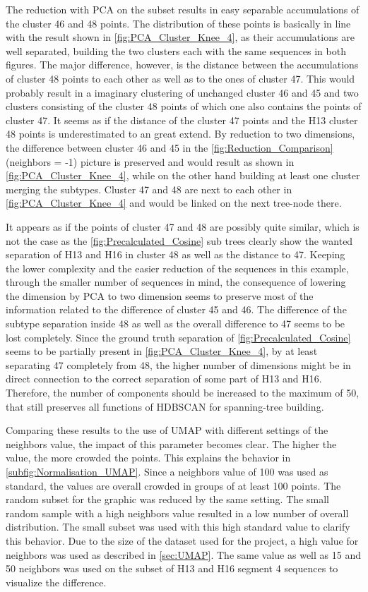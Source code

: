 The reduction with \gls{PCA} on the subset results in easy separable accumulations of the cluster 46 and 48 points. The distribution of these points is basically in line with the result shown in \autoref{fig:PCA_Cluster_Knee_4}, as their accumulations are well separated, building the two clusters each with the same sequences in both figures. The major difference, however, is the distance between the accumulations of cluster 48 points to each other as well as to the ones of cluster 47. This would probably result in a imaginary clustering of unchanged cluster 46 and 45 and two clusters consisting of the cluster 48 points of which one also contains the points of cluster 47. It seems as if the distance of the cluster 47 points and the H13 cluster 48 points is underestimated to an great extend. By reduction to two dimensions, the difference between cluster 46 and 45 in the \autoref{fig:Reduction_Comparison} (neighbors = -1) picture is preserved and would result as shown in \autoref{fig:PCA_Cluster_Knee_4}, while on the other hand building at least one cluster merging the subtypes. Cluster 47 and 48 are next to each other in \autoref{fig:PCA_Cluster_Knee_4} and would be linked on the next tree-node there.

It appears as if the points of cluster 47 and 48 are possibly quite similar, which is not the case as the \autoref{fig:Precalculated_Cosine} sub trees clearly show the wanted separation of H13 and H16 in cluster 48 as well as the distance to 47. Keeping the lower complexity and the easier reduction of the sequences in this example, through the smaller number of sequences in mind, the consequence of lowering the dimension by \gls{PCA} to two dimension seems to preserve most of the information related to the difference of cluster 45 and 46. The difference of the subtype separation inside 48 as well as the overall difference to 47 seems to be lost completely. Since the ground truth separation of \autoref{fig:Precalculated_Cosine} seems to be partially present in \autoref{fig:PCA_Cluster_Knee_4}, by at least separating 47 completely from 48, the higher number of dimensions might be in direct connection to the correct separation of some part of H13 and H16. Therefore, the number of components should be increased to the maximum of 50, that still preserves all functions of \gls{HDBSCAN} for spanning-tree building. 

Comparing these results to the use of \gls{UMAP} with different settings of the neighbors value, the impact of this parameter becomes clear. The higher the value, the more crowded the points. This explains the behavior in \autoref{subfig:Normalisation_UMAP}. Since a neighbors value of 100 was used as standard, the values are overall crowded in groups of at least 100 points. The random subset for the graphic was reduced by the same setting. The small random sample with a high neighbors value resulted in a low number of overall distribution. The small subset was used with this high standard value to clarify this behavior. Due to the size of the dataset used for the project, a high value for neighbors was used as described in \autoref{sec:UMAP}. The same value as well as 15 and 50 neighbors was used on the subset of H13 and H16 segment 4 sequences to visualize the difference. 

